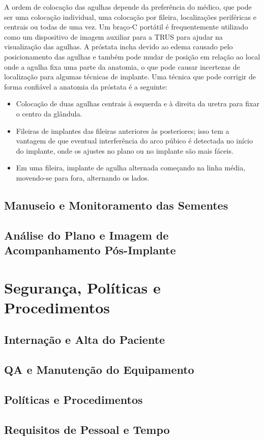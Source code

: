 \documentclass[11pt,a4paper]{article}
\begin{document}
	A ordem de colocação das agulhas depende da preferência do médico, que pode ser uma colocação individual, uma colocação por fileira, localizações periféricas e centrais ou todas de uma vez. Um braço-C portátil é frequentemente utilizado como um dispositivo de imagem auxiliar para a TRUS para ajudar na visualização das agulhas. A próstata incha devido ao edema causado pelo posicionamento das agulhas e também pode mudar de posição em relação ao local onde a agulha fixa uma parte da anatomia, o que pode causar incertezas de localização para algumas técnicas de implante. Uma técnica que pode corrigir de forma confiável a anatomia da próstata é a seguinte:

	\begin{itemize}[label=\textcolor{CarnationPink}{$\blacksquare$}]
		\item Colocação de duas agulhas centrais à esquerda e à direita da uretra para fixar o centro da glândula.
		\item Fileiras de implantes das fileiras anteriores às posteriores; isso tem a vantagem de que eventual interferência do arco púbico é detectada no início do implante, onde os ajustes no plano ou no implante são mais fáceis.
		\item Em uma fileira, implante de agulha alternada começando na linha média, movendo-se para fora, alternando os lados.
	\end{itemize}

\subsection*{Manuseio e Monitoramento das Sementes}

\subsection*{Análise do Plano e Imagem de Acompanhamento Pós-Implante}

\section{Segurança, Políticas e Procedimentos}

\subsection*{Internação e Alta do Paciente}

\subsection*{QA e Manutenção do Equipamento}

\subsection*{Políticas e Procedimentos}

\subsection*{Requisitos de Pessoal e Tempo}



\end{document}
